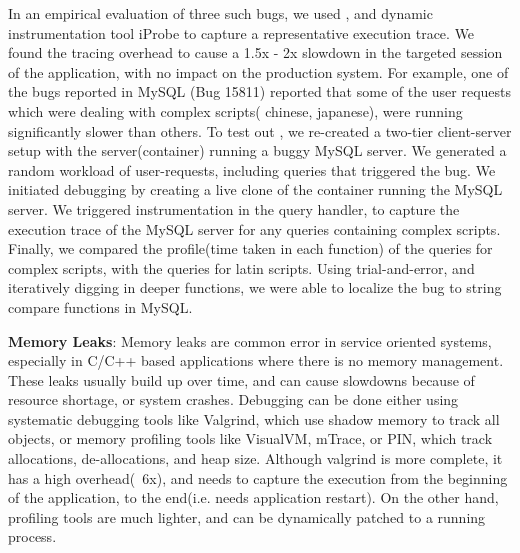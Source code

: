 In an empirical evaluation of three such bugs, we used \parikshan, and dynamic instrumentation tool iProbe to capture a representative execution trace.
We found the tracing overhead to cause a 1.5x - 2x slowdown in the targeted session of the application,  with no impact on the production system.
For example, one of the bugs reported in  MySQL (Bug 15811) reported that some of the user requests which were dealing with complex scripts( chinese, japanese), were running significantly slower than others.
To test out \parikshan, we re-created a two-tier client-server setup with the server(container) running a buggy MySQL server. 
We generated a random workload of user-requests, including queries that triggered the bug.
We initiated debugging by creating a live clone of the container running the MySQL server.
We triggered instrumentation in the query handler, to capture the execution trace of the MySQL server for any queries containing complex scripts.
Finally, we compared the profile(time taken in each function) of the queries for complex scripts, with the queries for latin scripts.
Using trial-and-error, and iteratively digging in deeper functions, we were able to localize the bug to string compare functions in MySQL.


\noindent
\textbf{Memory Leaks}: %
Memory leaks are common error in service oriented systems, especially in C/C++ based applications where there is no memory management.
These leaks usually build up over time, and can cause slowdowns because of resource shortage, or system crashes.
Debugging can be done either using systematic debugging tools like Valgrind, which use shadow memory to track all objects, or memory profiling tools like VisualVM, mTrace, or PIN, which track allocations, de-allocations, and heap size.
Although valgrind is more complete, it has a high overhead(~6x), and needs to capture the execution from the beginning of the application, to the end(i.e. needs application restart).
On the other hand, profiling tools are much lighter, and can be dynamically patched to a running process.


